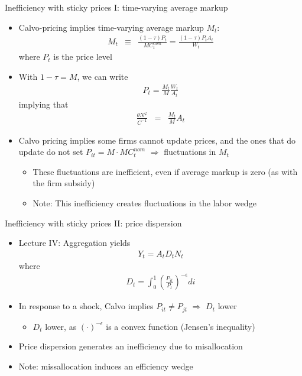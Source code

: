\documentclass[9pt,xcolor={dvipsnames}]{beamer}
\newcommand{\bit}{\begin{itemize}}
\newcommand{\eit}{\end{itemize}}
\newcommand{\bc}{\color{blue}}
\begin{document}
\begin{frame}{Inefficiency with sticky prices I: time-varying average markup}

\bit
\setlength\itemsep{1.5em}
\item Calvo-pricing implies time-varying {\bc average markup} $M_t$:
\begin{eqnarray}
M_t &\equiv& \frac{(1-\tau) P_t}{MC^{nom}_t} = \frac{(1-\tau) P_tA_t}{W_t} \nonumber
\end{eqnarray}
where $P_t$ is the price level

\item With $1-\tau=M$, we can write
\begin{eqnarray}
P_t = \frac{M_t}{M} \frac{W_t}{A_t} \nonumber
\end{eqnarray}
implying that
\begin{eqnarray}
\frac{\theta N^{\varphi}}{C^{-1}} &=& \frac{M_t}{M}A_t \nonumber 
\end{eqnarray}

\item Calvo pricing implies some firms cannot update prices, and the ones that do update do not set $P_{it} = M \cdot MC^{nom}_t$ $\Rightarrow$ fluctuations in $M_t$
\bit
	\item These fluctuations are inefficient, even if average markup is zero (as with the firm subsidy)
	
	\item Note: This inefficiency creates fluctuations in the labor wedge
\eit

\eit

\end{frame}


\begin{frame}{Inefficiency with sticky prices II: price dispersion}

\bit
\setlength\itemsep{1.5em}
\item Lecture IV: Aggregation yields
\begin{eqnarray}
Y_t = A_t D_t N_t \nonumber
\end{eqnarray}
where 
\begin{eqnarray}
D_t = \int_{0}^{1} \left(\frac{P_{it}}{P_t} \right)^{-\epsilon}di \nonumber
\end{eqnarray}

\item In response to a shock, Calvo implies $P_{it} \neq P_{jt}$ $\Rightarrow$ $D_t$ lower
	\bit
		\item $D_t$ lower, as $(\cdot)^{-\epsilon}$ is a convex function (Jensen's inequality)
	\eit
	
\item Price dispersion generates an inefficiency due to {\bc misallocation}

\item Note: missallocation induces an efficiency wedge

\eit
	
\end{frame}
\end{document}
